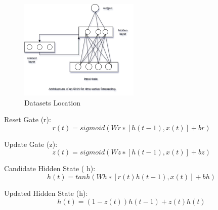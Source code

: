 \documentclass[a4paper,fleqn]{cas-sc}
\begin{document}
\begin{figure}[!ht]
\centering
\includegraphics[width=\textwidth]{ENN diagram}
\caption{Datasets Location }
\label{Architecture}
\end{figure}


Reset Gate (r):
\begin{equation} 
  𝑟(𝑡) = 𝑠𝑖𝑔𝑚𝑜𝑖𝑑(𝑊𝑟 ∗ [ℎ(𝑡 − 1), 𝑥(𝑡)] + 𝑏𝑟)
\end{equation}  

Update Gate (z): 
\begin{equation}
  𝑧(𝑡) = 𝑠𝑖𝑔𝑚𝑜𝑖𝑑(𝑊𝑧 ∗ [ℎ(𝑡 − 1), 𝑥(𝑡)] + 𝑏𝑧)
\end{equation}

Candidate Hidden State ( h):
\begin{equation}
  ℎ(𝑡) = 𝑡𝑎𝑛ℎ(𝑊ℎ ∗ [𝑟(𝑡) ℎ(𝑡 − 1), 𝑥(𝑡)] + 𝑏ℎ)
\end{equation}

Updated Hidden State (h):
\begin{equation}
  ℎ(𝑡) = (1 − 𝑧(𝑡)) ℎ(𝑡 − 1) + 𝑧(𝑡)ℎ(𝑡)
\end{equation}
\end{document}
